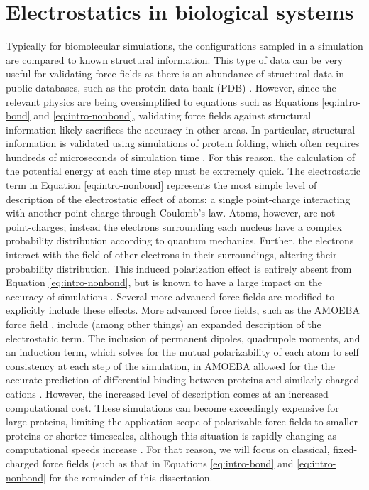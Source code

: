 \section{Electrostatics in biological systems}\label{intro-electrostatic}

Typically for biomolecular simulations, the configurations sampled in a simulation are compared to known structural information.  
This type of data can be very useful for validating force fields as there is an abundance of structural data in public databases, such as the protein data bank (PDB) \cite{Berman2000}. 
However, since the relevant physics are being oversimplified to equations such as Equations \ref{eq:intro-bond} and \ref{eq:intro-nonbond}, validating force fields against structural information likely sacrifices the accuracy in other areas.
In particular, structural information is validated using simulations of protein folding, which often requires hundreds of microseconds of simulation time \cite{Duan1998, Lindorff-Larsen2011, Bowman2011, Voelz2012, Shaw2010, Lane2013, Koukos2014}. 
For this reason, the calculation of the potential energy at each time step must be extremely quick. 
The electrostatic term in Equation \ref{eq:intro-nonbond} represents the most simple level of description of the electrostatic effect of atoms: a single point-charge interacting with another point-charge through Coulomb's law. 
Atoms, however, are not point-charges; instead the electrons surrounding each nucleus have a complex probability distribution according to quantum mechanics.
Further, the electrons interact with the field of other electrons in their surroundings, altering their probability distribution. 
This induced polarization effect is entirely absent from Equation \ref{eq:intro-nonbond}, but is known to have a large impact on the accuracy of simulations \cite{Halgren2001, Mackerell2004, Baker2015}. 
Several more advanced force fields are modified to explicitly include these effects. 
More advanced force fields, such as the AMOEBA force field \cite{Ponder2010, Shi2013}, include (among other things) an expanded description of the electrostatic term. 
The inclusion of permanent dipoles, quadrupole moments, and an induction term, which solves for the mutual polarizability of each atom to self consistency at each step of the simulation, in AMOEBA allowed for the the accurate prediction of differential binding between proteins and similarly charged cations \cite{Jing2018}.
However, the increased level of description comes at an increased computational cost.
These simulations can become exceedingly expensive for large proteins, limiting the application scope of polarizable force fields to smaller proteins or shorter timescales, although this situation is rapidly changing as computational speeds increase \cite{Baker2015}. 
For that reason, we will focus on classical, fixed-charged force fields (such as that in Equations \ref{eq:intro-bond} and \ref{eq:intro-nonbond} for the remainder of this dissertation. 

